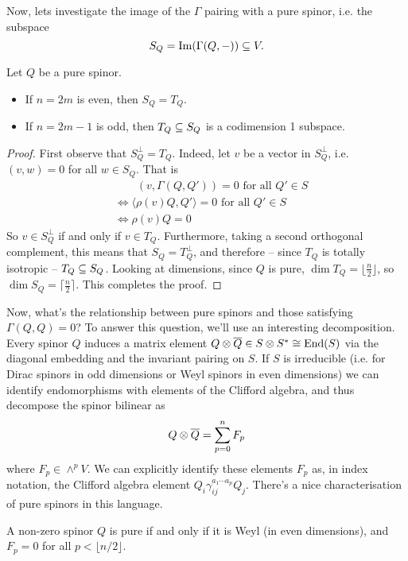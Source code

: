 \documentclass[10pt, oneside]{article}
\begin{document}
Now, lets investigate the image of the $\Gamma$ pairing with a pure spinor, i.e. the subspace
\[S_Q = \mathrm{Im}(\Gamma(Q,-)) \subseteq V.\]
\begin{prop} \label{purespinorimage}
Let $Q$ be a pure spinor.
\vspace{-6pt}
\begin{itemize}
 \item If $n=2m$ is even, then $S_Q = T_Q$.
 \item If $n=2m-1$ is odd, then $T_Q \subseteq S_Q$ is a codimension 1 subspace.
\end{itemize}
\vspace{-6pt}
\end{prop}

\begin{proof}
First observe that $S_Q^\perp = T_Q$.  Indeed, let $v$ be a vector in $S_Q^\perp$, i.e. $(v, w) = 0$ for all $w \in S_Q$.  That is
\begin{align*}
&\qquad (v, \Gamma(Q,Q')) = 0 \text{ for all } Q' \in S \\
&\Leftrightarrow \langle \rho(v)Q, Q' \rangle  = 0 \text{ for all } Q' \in S \\
&\Leftrightarrow \rho(v)Q = 0 
\end{align*}
So $v \in S_Q^\perp$ if and only if $v \in T_Q$.  Furthermore, taking a second orthogonal complement, this means that $S_Q = T_Q^\perp$, and therefore -- since $T_Q$ is totally isotropic -- $T_Q \subseteq S_Q$.  Looking at dimensions, since $Q$ is pure, $\dim T_Q = \lfloor \frac n2 \rfloor$, so $\dim  S_Q = \lceil \frac n2 \rceil$.  This completes the proof.
\end{proof}

Now, what's the relationship between pure spinors and those satisfying $\Gamma(Q,Q)=0$?  To answer this question, we'll use an interesting decomposition.  Every spinor $Q$ induces a matrix element $Q \otimes \overline{Q} \in S \otimes S^* \cong \operatorname{End}(S)$ via the diagonal embedding and the invariant pairing on $S$.  If $S$ is irreducible (i.e. for Dirac spinors in odd dimensions or Weyl spinors in even dimensions) we can identify endomorphisms with elements of the Clifford algebra, and thus decompose the spinor bilinear as
\[Q \otimes \overline{Q} = \sum_{p=0}^n F_p\]
where $F_p \in \wedge^p V$.  We can explicitly identify these elements $F_p$ as, in index notation, the Clifford algebra element $Q_i \gamma^{a_1 \cdots a_p}_{ij} Q_j$.  There's a nice characterisation of pure spinors in this language.
\begin{theorem}[Chevalley] \label{ChevalleyCriterion}
A non-zero spinor $Q$ is pure if and only if it is Weyl (in even dimensions), and $F_p = 0$ for all $p < \lfloor n/2 \rfloor$. 
\end{theorem}
\end{document}
